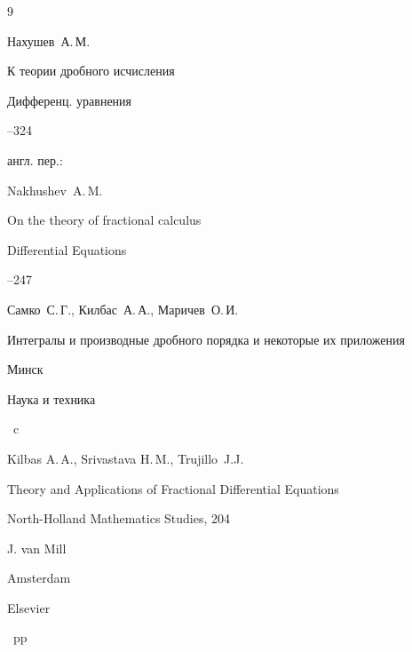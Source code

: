 


\begin{thebibliography}{9}


\by Нахушев~А.\,М.

\paper К теории дробного исчисления

\jour Дифференц. уравнения




--324

\transl

англ. пер.:

\by Nakhushev~A.\,M.

\paper On the theory of fractional calculus

\jour Differential Equations




--247 






\by Самко~С.\,Г.,  Килбас~А.\,А.,  Маричев~О.\,И.

\book Интегралы и производные дробного порядка и некоторые их приложения

\publaddr Минск

\publ Наука и техника


~c




\by Kilbas A.\,A., Srivastava H.\,M., Trujillo~J.J.

\paper Theory and Applications of Fractional Differential Equations

\serial North-Holland Mathematics Studies, 204

\ed J. van Mill

\publaddr Amsterdam

\publ Elsevier


~pp

\end{thebibliography}





\newpage






\makeengtitlem







%

